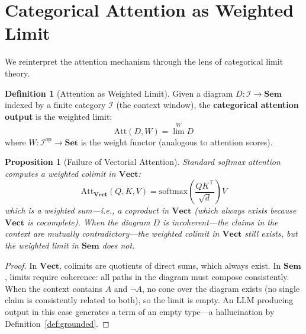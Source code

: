 \documentclass[11pt,a4paper]{article}
\theoremstyle{plain}
\newtheorem{proposition}[theorem]{Proposition}
\theoremstyle{definition}
\newtheorem{definition}[theorem]{Definition}
\newcommand{\Sem}{\mathbf{Sem}}
\newcommand{\Vect}{\mathbf{Vect}}
\newcommand{\Set}{\mathbf{Set}}
\newcommand{\op}{\mathrm{op}}
\begin{document}
\section{Categorical Attention as Weighted Limit}\label{sec:attention}

We reinterpret the attention mechanism through the lens of categorical limit theory.

\begin{definition}[Attention as Weighted Limit]\label{def:cattention}
Given a diagram $D\colon \mathcal{I} \to \Sem$ indexed by a finite category $\mathcal{I}$ (the context window), the \textbf{categorical attention output} is the weighted limit:
\begin{equation}\label{eq:cattention}
  \mathrm{Att}(D, W) = \lim^W D
\end{equation}
where $W\colon \mathcal{I}^{\op} \to \Set$ is the weight functor (analogous to attention scores).
\end{definition}

\begin{proposition}[Failure of Vectorial Attention]\label{prop:attfail}
Standard softmax attention computes a weighted \emph{colimit} in $\Vect$:
\begin{equation}\label{eq:softmax}
  \mathrm{Att}_{\Vect}(Q, K, V) = \mathrm{softmax}\!\left(\frac{QK^\top}{\sqrt{d}}\right) V
\end{equation}
which is a weighted sum---i.e., a coproduct in $\Vect$ (which always exists because $\Vect$ is cocomplete). When the diagram $D$ is \emph{incoherent}---the claims in the context are mutually contradictory---the weighted colimit in $\Vect$ still exists, but the weighted limit in $\Sem$ does not.
\end{proposition}

\begin{proof}
In $\Vect$, colimits are quotients of direct sums, which always exist. In $\Sem$, limits require coherence: all paths in the diagram must compose consistently. When the context contains $A$ and $\neg A$, no cone over the diagram exists (no single claim is consistently related to both), so the limit is empty. An LLM producing output in this case generates a term of an empty type---a hallucination by Definition~\ref{def:grounded}.
\end{proof}
\end{document}
